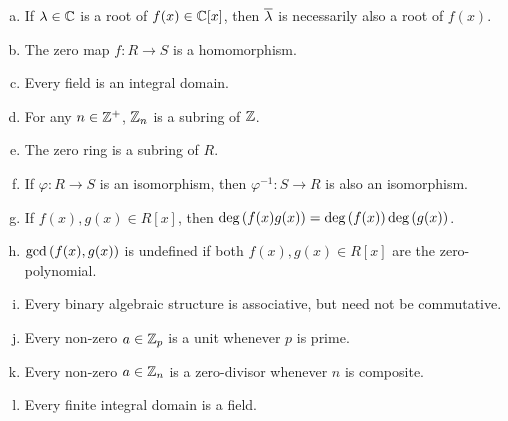 \documentclass[11pt]{exam}
\begin{document}
\begin{questions}
\begin{enumerate}[(a)]
\item \underline{\hspace{1cm}} If $\lambda\in \mathbb{C}$ is a root of $f(x)\in\mathbb{C}[x]$, then $\overline{\lambda}$ is necessarily also a root of $f(x)$.
\vsp

\item \underline{\hspace{1cm}} The zero map $f:R\to S$ is a homomorphism.
\vsp

\item \underline{\hspace{1cm}} Every field is an integral domain.
\vsp

\item \underline{\hspace{1cm}} For any $n\in\mathbb{Z}^{+}$, $\mathbb{Z}_{n}$ is a subring of $\mathbb{Z}$.
\vsp

\item \underline{\hspace{1cm}} The zero ring is a subring of $R$.
\vsp

\item \underline{\hspace{1cm}} If $\varphi:R\to S$ is an isomorphism, then $\varphi^{-1}:S\to R$ is also an isomorphism.
\vsp

\item \underline{\hspace{1cm}} If $f(x),g(x)\in R[x]$, then $\text{deg}\left(f(x)g(x)\right) = \text{deg}\left(f(x)\right)\text{deg}\left(g(x)\right)$.
\vsp

\item \underline{\hspace{1cm}} $\text{gcd}\left(f(x),g(x)\right)$ is undefined if both $f(x), g(x)\in R[x]$ are the zero-polynomial.
\vsp

\item \underline{\hspace{1cm}} Every binary algebraic structure is associative, but need not be commutative.
\vsp

\item \underline{\hspace{1cm}} Every non-zero $a\in\mathbb{Z}_{p}$ is a unit whenever $p$ is prime.
\vsp

\item \underline{\hspace{1cm}} Every non-zero $a\in\mathbb{Z}_{n}$ is a zero-divisor whenever $n$ is composite.
\vsp

\item \underline{\hspace{1cm}} Every finite integral domain is a field.
\vsp


\end{enumerate}
\end{questions}
\end{document}
